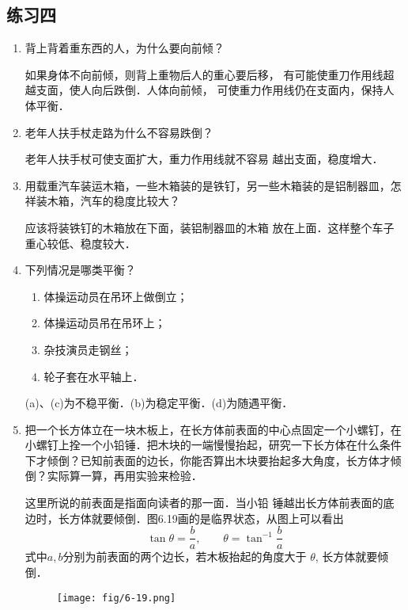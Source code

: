 \subsection{练习四}
\begin{enumerate}
    \item 背上背着重东西的人，为什么要向前倾？


    \begin{solution}
        如果身体不向前倾，则背上重物后人的重心要后移，
        有可能使重刀作用线超越支面，使人向后跌倒．人体向前倾，
        可使重力作用线仍在支面内，保持人体平衡．
    \end{solution}
    \item 老年人扶手杖走路为什么不容易跌倒？


    \begin{solution}
        老年人扶手杖可使支面扩大，重力作用线就不容易
        越出支面，稳度增大．
    \end{solution}
    \item 用载重汽车装运木箱，一些木箱装的是铁钉，另一些木箱装的是铝制器皿，怎祥装木箱，汽车的稳度比较大？


    \begin{solution}
        应该将装铁钉的木箱放在下面，装铝制器皿的木箱
        放在上面．这样整个车子重心较低、稳度较大．
    \end{solution}
    \item 下列情况是哪类平衡？
    \begin{enumerate}
        \item 体操运动员在吊环上做倒立；
        \item 体操运动员吊在吊环上；
        \item 杂技演员走钢丝；
        \item 轮子套在水平轴上．
    \end{enumerate}


    \begin{solution}
       (a)、(c)为不稳平衡．(b)为稳定平衡．(d)为随遇平衡．
    \end{solution}
    \item 把一个长方体立在一块木板上，在长方体前表面的中心点固定一个小螺钉，在小螺钉上拴一个小铅锤．把木块的一端慢慢抬起，研究一下长方体在什么条件下才倾倒？已知前表面的边长，你能否算出木块要抬起多大角度，长方体才倾倒？实际算一算，再用实验来检验．


    \begin{solution}
        这里所说的前表面是指面向读者的那一面．当小铅
        锤越出长方体前表面的底边时，长方体就要倾倒．图6.19画的是临界状态，从图上可以看出
\[\tan\theta=\frac{b}{a},\qquad \theta=\tan^{-1}\frac{b}{a}\]
        式中$a,b$分别为前表面的两个边长，若木板抬起的角度大于
        $\theta$, 长方体就要倾倒．
    \end{solution}
    \begin{figure}[htp]
        \centering    \texttt{[image: fig/6-19.png]}
        \caption{}
        \end{figure}
\end{enumerate}












